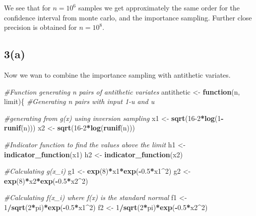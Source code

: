 \documentclass[
]{article}
\newenvironment{Shaded}{\begin{snugshade}}{\end{snugshade}}
\newcommand{\CommentTok}[1]{\textcolor[rgb]{0.56,0.35,0.01}{\textit{#1}}}
\newcommand{\ControlFlowTok}[1]{\textcolor[rgb]{0.13,0.29,0.53}{\textbf{#1}}}
\newcommand{\DecValTok}[1]{\textcolor[rgb]{0.00,0.00,0.81}{#1}}
\newcommand{\FloatTok}[1]{\textcolor[rgb]{0.00,0.00,0.81}{#1}}
\newcommand{\KeywordTok}[1]{\textcolor[rgb]{0.13,0.29,0.53}{\textbf{#1}}}
\newcommand{\NormalTok}[1]{#1}
\newcommand{\OperatorTok}[1]{\textcolor[rgb]{0.81,0.36,0.00}{\textbf{#1}}}
\newcommand{\StringTok}[1]{\textcolor[rgb]{0.31,0.60,0.02}{#1}}
\begin{document}
We see that for \(n=10^6\) samples we get approximately the same order
for the confidence interval from monte carlo, and the importance
sampling. Further close precision is obtained for \(n=10^8\).

\hypertarget{a-5}{%
\subsection{3(a)}\label{a-5}}

Now we wan to combine the importance sampling with antithetic variates.

\begin{Shaded}
\begin{Highlighting}[]
\CommentTok{#Function generating n pairs of antithetic variates}
\NormalTok{antithetic <-}\StringTok{ }\ControlFlowTok{function}\NormalTok{(n, limit)\{}
  \CommentTok{#Generating n pairs with input 1-u and u}
  
  \CommentTok{#generating from g(x) using inversion sampling}
\NormalTok{  x1 <-}\StringTok{ }\KeywordTok{sqrt}\NormalTok{(}\DecValTok{16-2}\OperatorTok{*}\KeywordTok{log}\NormalTok{(}\DecValTok{1}\OperatorTok{-}\KeywordTok{runif}\NormalTok{(n))) }
\NormalTok{  x2 <-}\StringTok{ }\KeywordTok{sqrt}\NormalTok{(}\DecValTok{16-2}\OperatorTok{*}\KeywordTok{log}\NormalTok{(}\KeywordTok{runif}\NormalTok{(n)))}
  
  \CommentTok{#Indicator function to find the values above the limit}
\NormalTok{  h1 <-}\StringTok{ }\KeywordTok{indicator_function}\NormalTok{(x1) }
\NormalTok{  h2 <-}\StringTok{ }\KeywordTok{indicator_function}\NormalTok{(x2)}
  
  \CommentTok{#Calculating g(x_i)}
\NormalTok{  g1 <-}\StringTok{ }\KeywordTok{exp}\NormalTok{(}\DecValTok{8}\NormalTok{)}\OperatorTok{*}\NormalTok{x1}\OperatorTok{*}\KeywordTok{exp}\NormalTok{(}\OperatorTok{-}\FloatTok{0.5}\OperatorTok{*}\NormalTok{x1}\OperatorTok{^}\DecValTok{2}\NormalTok{) }
\NormalTok{  g2 <-}\StringTok{ }\KeywordTok{exp}\NormalTok{(}\DecValTok{8}\NormalTok{)}\OperatorTok{*}\NormalTok{x2}\OperatorTok{*}\KeywordTok{exp}\NormalTok{(}\OperatorTok{-}\FloatTok{0.5}\OperatorTok{*}\NormalTok{x2}\OperatorTok{^}\DecValTok{2}\NormalTok{) }
  
  \CommentTok{#Calculating f(x_i) where f(x) is the standard normal}
\NormalTok{  f1 <-}\StringTok{ }\DecValTok{1}\OperatorTok{/}\KeywordTok{sqrt}\NormalTok{(}\DecValTok{2}\OperatorTok{*}\NormalTok{pi)}\OperatorTok{*}\KeywordTok{exp}\NormalTok{(}\OperatorTok{-}\FloatTok{0.5}\OperatorTok{*}\NormalTok{x1}\OperatorTok{^}\DecValTok{2}\NormalTok{) }
\NormalTok{  f2 <-}\StringTok{ }\DecValTok{1}\OperatorTok{/}\KeywordTok{sqrt}\NormalTok{(}\DecValTok{2}\OperatorTok{*}\NormalTok{pi)}\OperatorTok{*}\KeywordTok{exp}\NormalTok{(}\OperatorTok{-}\FloatTok{0.5}\OperatorTok{*}\NormalTok{x2}\OperatorTok{^}\DecValTok{2}\NormalTok{)}
  

\end{Highlighting}
\end{Shaded}
\end{document}
